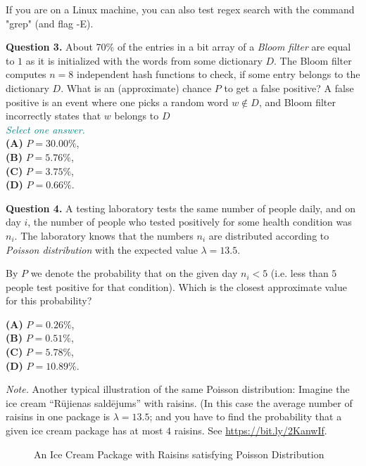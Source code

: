 \documentclass[jou]{apa6}
\begin{document}
If you are on a Linux machine, you can also 
test regex search with the command "grep" (and flag -E). 


\vspace{10pt}
{\bf Question 3.} About 70\% of the entries in a bit array of a {\em Bloom filter} are 
equal to $1$ as it is initialized with the words 
from some dictionary $D$. 
The Bloom filter computes $n=8$ independent hash functions to check, 
if some entry belongs to the dictionary $D$. 
What is an (approximate) chance $P$ to get a false positive?
A false positive is an event where one picks 
a random word $w \not\in D$,
and Bloom filter incorrectly states that $w$ belongs to $D$\\

\vspace{4pt}
\textcolor{teal}{\em Select one answer.}\\
{\bf (A)} $P = 30.00\%$,\\
{\bf (B)} $P = 5.76\%$,\\
{\bf (C)} $P = 3.75\%$,\\
{\bf (D)} $P = 0.66\%$.



\vspace{10pt}
{\bf Question 4.} 
A testing laboratory tests the same number of people daily, and on day $i$, the number
of people who tested positively for some health condition was $n_i$. The laboratory knows that 
the numbers $n_i$ are distributed according to {\em Poisson distribution} with the 
expected value $\lambda = 13.5$. 

By $P$ we denote the probability that on the given day 
$n_i < 5$ (i.e. less than $5$ people test 
positive for that condition). Which is the closest approximate value for this probability? 

{\bf (A)} $P = 0.26\%$,\\
{\bf (B)} $P = 0.51\%$,\\
{\bf (C)} $P = 5.78\%$,\\
{\bf (D)} $P = 10.89\%$.

{\em Note.} Another typical illustration of the same Poisson distribution: 
Imagine the ice cream ``R\={u}jienas sald\={e}jums'' with raisins. (In this case
the average number of raisins in one package is $\lambda = 13.5$; and you have to find the 
probability that a given ice cream package has at most $4$ raisins. 
See \url{https://bit.ly/2KanwIf}. 

\begin{figure}[!htb]
\caption{\label{fig:rujiena-icecream} An Ice Cream Package with Raisins satisfying Poisson Distribution}
\end{figure}
\end{document}
